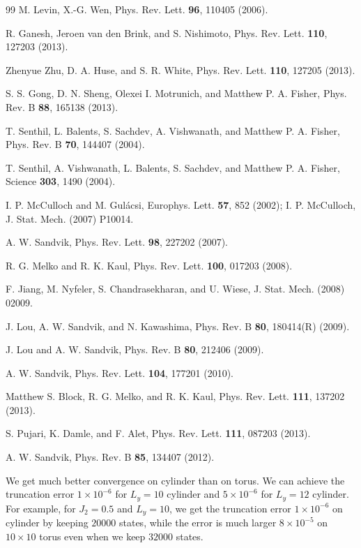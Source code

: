 \documentclass[prl,aps,epsf,showpacs,twocolumn]{revtex4}
\begin{document}
\begin{thebibliography}{99}
 M. Levin, X.-G. Wen, Phys. Rev. Lett. \textbf{96}, 110405 (2006).

 R. Ganesh, Jeroen van den Brink, and S. Nishimoto, Phys. Rev. Lett. \textbf{110}, 127203 (2013). 

 Zhenyue Zhu, D. A. Huse, and S. R. White, Phys. Rev. Lett. \textbf{110}, 127205 (2013).

 S. S. Gong, D. N. Sheng, Olexei I. Motrunich, and Matthew P. A. Fisher, Phys. Rev. B \textbf{88}, 165138 (2013).

 T. Senthil, L. Balents, S. Sachdev, A. Vishwanath, and Matthew P. A. Fisher, Phys. Rev. B \textbf{70}, 144407 (2004).

 T. Senthil, A. Vishwanath, L. Balents, S. Sachdev, and Matthew P. A. Fisher, Science \textbf{303}, 1490 (2004). 

 I. P. McCulloch and M. Gul\'{a}csi, Europhys. Lett. \textbf{57}, 852 (2002); I. P. McCulloch, J. Stat. Mech. (2007) P10014.

 A. W. Sandvik, Phys. Rev. Lett. \textbf{98}, 227202 (2007).

 R. G. Melko and R. K. Kaul, Phys. Rev. Lett. \textbf{100}, 017203 (2008).

 F. Jiang, M. Nyfeler, S. Chandrasekharan, and U. Wiese, J. Stat. Mech. (2008) 02009.

 J. Lou, A. W. Sandvik, and N. Kawashima, Phys. Rev. B {\bf 80}, 180414(R) (2009).

 J. Lou and A. W. Sandvik, Phys. Rev. B {\bf 80}, 212406 (2009).

 A. W. Sandvik, Phys. Rev. Lett. \textbf{104}, 177201 (2010).

 Matthew S. Block, R. G. Melko, and R. K. Kaul, Phys. Rev. Lett. \textbf{111}, 137202 (2013).

 S. Pujari, K. Damle, and F. Alet, Phys. Rev. Lett. \textbf{111}, 087203 (2013).

 A. W. Sandvik, Phys. Rev. B \textbf{85}, 134407 (2012).

 We get much better convergence on cylinder than on torus. We can achieve the
truncation error $1 \times 10^{-6}$ for $L_y = 10$ cylinder and $5\times 10^{-6}$ for $L_y = 12$ cylinder. For example, for $J_2 = 0.5$ and $L_y = 10$, we get the truncation error $1 \times 10^{-6}$ on cylinder by keeping $20000$ states, while the error is much larger $8 \times 10^{-5}$ on $10 \times 10$ torus even when we keep $32000$ states.


\end{thebibliography}
\end{document}
